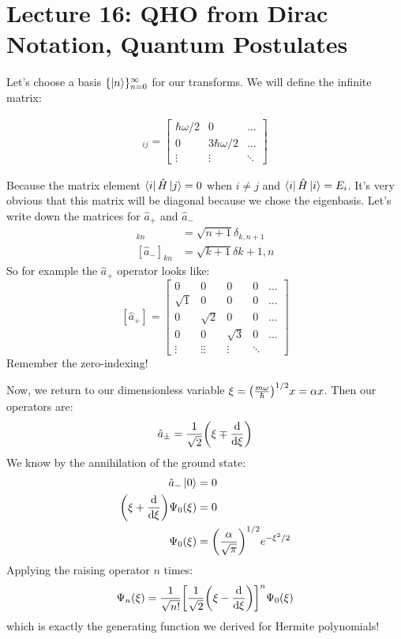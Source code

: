 \section{Lecture 16: QHO from Dirac Notation, Quantum Postulates}

Let's choose a basis $\{\ket{n}\}_{n = 0}^{\infty}$ for our transforms.
We will define the infinite matrix:

\begin{align*}
    [\hat{H}]_{ij} = \begin{bmatrix}
        \hbar \omega / 2 & 0 & \dots \\
        0 & 3\hbar\omega / 2 & \dots \\
        \vdots & \vdots & \ddots
    \end{bmatrix}
\end{align*}

Because the matrix element $\bra{i} \hat{H} \ket*{j} = 0$
when $i \neq j$ and $\bra{i} \hat{H} \ket*{i} = E_i$. It's very obvious
that this matrix will be diagonal because we chose the eigenbasis. Let's
write down the matrices for $\hat{a}_{+}$ and $\hat{a}_{-}$
\begin{align*}
    [\hat{a}_{+}]_{kn} &= \sqrt{n + 1} \delta_{k, n + 1} \\
    [\hat{a}_{-}]_{kn} &= \sqrt{k + 1} \delta{k + 1, n}
\end{align*}
So for example the $\hat{a}_{+}$ operator looks like:
\[
    [\hat{a}_{+}] = \begin{bmatrix}
        0 & 0 & 0 & 0 & \dots \\
        \sqrt{1} & 0 & 0 & 0 & \dots \\
        0 & \sqrt{2} & 0 & 0 & \dots \\
        0 & 0 & \sqrt{3} & 0 & \dots \\
        \vdots & \vdots \vdots & \vdots & \ddots
    \end{bmatrix}
\]
Remember the zero-indexing!

Now, we return to our dimensionless variable $\xi = \qty(\frac{m \omega}{\hbar})^{1/2} x = \alpha x$.
Then our operators are:
\[ \hat{a}_{\pm} = \frac{1}{\sqrt{2}} \qty(\xi \mp \derivative{}{\xi}) \]
We know by the annihilation of the ground state:
\begin{align*}
    \hat{a}_{-} \ket*{0} &= 0\\
    \qty(\xi + \derivative{}{\xi}) \Psi_0(\xi) &= 0 \\
    \Psi_0(\xi) &= \qty(\frac{\alpha}{\sqrt{\pi}})^{1/2} e^{-\xi^2/2}
\end{align*}
Applying the raising operator $n$ times:
\[ \Psi_n(\xi) = \frac{1}{\sqrt{n!}} \qty[\frac{1}{\sqrt{2}} \qty(\xi - \derivative{}{\xi})]^n \Psi_0(\xi) \]
which is exactly the generating function we derived for Hermite polynomials!

